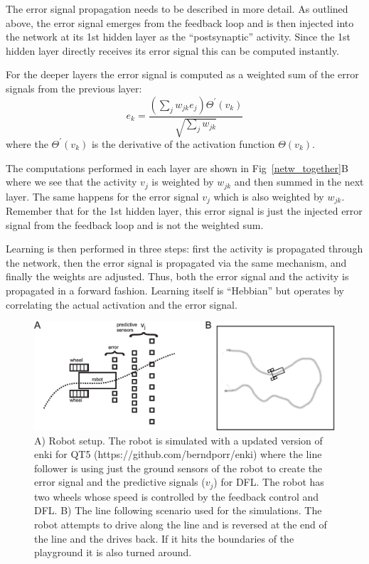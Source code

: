 \documentclass{llncs}
\begin{document}
The error signal propagation needs to be described in more detail. As outlined above, the error
signal emerges from the feedback loop and is then injected into the
network at its 1st hidden layer as the ``postsynaptic'' activity.
Since the 1st hidden layer directly receives its error signal this
can be computed instantly.

For the deeper layers the error signal is computed as a weighted
sum of the error signals from the previous layer:
\begin{equation}
  e_k = \frac{\left( \sum_j w_{jk} e_{j} \right) \Theta^\prime (v_k) }{\sqrt{\sum_j w_{jk}}}
\end{equation}
where the $\Theta^\prime (v_k)$ is the derivative of the activation
function $\Theta(v_k)$.

The computations performed in each layer are shown in
Fig~\ref{netw_together}B where we see that the activity $v_j$ is
weighted by $w_{jk}$ and then summed in the next
layer. The same happens for the error signal $v_j$ which is also
weighted by $w_{jk}$. Remember that for the 1st hidden layer, this
error signal is just the injected error signal from the feedback loop
and is not the weighted sum.

Learning is then performed in three steps: first the activity is propagated through
the network, then the error signal is propagated via the same mechanism, and finally the
weights are adjusted. Thus, both the error
signal and the activity is propagated in a forward fashion. 
Learning itself is ``Hebbian'' but operates by correlating the actual activation
and the error signal. 

\begin{figure}[h!]
  \centering
  \includegraphics[width=\columnwidth]{linefollower_robot_playground}
  \caption{A) Robot setup. The robot is simulated with a updated
    version of enki for QT5 (https://github.com/berndporr/enki)
    where the line follower is using just the ground sensors of the
    robot to create the error signal and the predictive signals ($v_j$)
    for DFL. The robot has two wheels whose speed is controlled
    by the feedback control and DFL.
    B) The line following scenario used for the simulations. The robot
    attempts to drive along the line and is reversed at the end of the
    line and the drives back. If it hits the boundaries of the playground
    it is also turned around.
    \label{linefollower_robot_playground}}
\end{figure}
\end{document}
